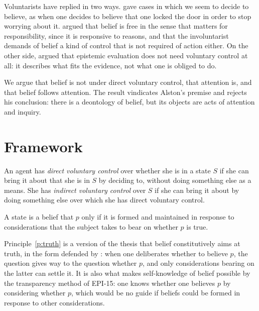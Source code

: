 \documentclass{situationist-preprint}
\begin{document}
Voluntarists have replied in two ways. \citet{Ginet2001} gave cases in which we seem to decide to believe, as when one decides to believe that one locked the door in order to stop worrying about it. \citet{Steup2008} argued that belief is free in the sense that matters for responsibility, since it is responsive to reasons, and that the involuntarist demands of belief a kind of control that is not required of action either. On the other side, \citet{Feldman2001} argued that epistemic evaluation does not need voluntary control at all: it describes what fits the evidence, not what one is obliged to do.

We argue that belief is not under direct voluntary control, that attention is, and that belief follows attention. The result vindicates Alston's premise and rejects his conclusion: there is a deontology of belief, but its objects are acts of attention and inquiry.

\section{Framework}

\begin{definition}\label{d:control}
An agent has \emph{direct voluntary control} over whether she is in a state $S$ if she can bring it about that she is in $S$ by deciding to, without doing something else as a means. She has \emph{indirect voluntary control} over $S$ if she can bring it about by doing something else over which she has direct voluntary control.
\end{definition}

\begin{principle}\label{p:truth}
A state is a belief that $p$ only if it is formed and maintained in response to considerations that the subject takes to bear on whether $p$ is true.
\end{principle}

Principle~\ref{p:truth} is a version of the thesis that belief constitutively aims at truth, in the form defended by \citet{ShahVelleman2005}: when one deliberates whether to believe $p$, the question gives way to the question whether $p$, and only considerations bearing on the latter can settle it. It is also what makes self-knowledge of belief possible by the transparency method of EPI-15: one knows whether one believes $p$ by considering whether $p$, which would be no guide if beliefs could be formed in response to other considerations.
\end{document}
